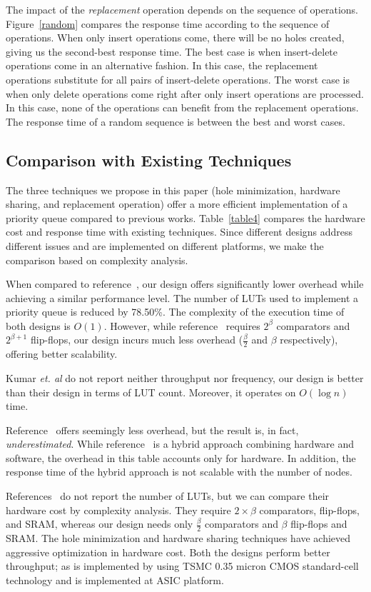 The impact of the {\it replacement} operation depends on the sequence of operations.
Figure~\ref{random} compares the response time according to the sequence of operations.
When only insert operations come, there will be no holes created, giving us the second-best response time.
The best case is when insert-delete operations come in an alternative fashion.
In this case, the replacement operations substitute for all pairs of insert-delete operations.
The worst case is when only delete operations come right after only insert operations are processed.
In this case, none of the operations can benefit from the replacement operations.
The response time of a random sequence is between the best and worst cases.

\subsection{Comparison with Existing Techniques}

The three techniques we propose in this paper (hole minimization, hardware sharing, and replacement operation) offer a more efficient implementation of a priority queue compared to previous works.
Table~\ref{table4} compares the hardware cost and response time with existing techniques.
Since different designs address different issues and are implemented on different platforms, we make the comparison based on complexity analysis.

When compared to reference~\cite{hw8}, our design offers significantly lower overhead while achieving a similar performance level.
The number of LUTs used to implement a priority queue is reduced by 78.50\%.
The complexity of the execution time of both designs is $O(1)$.
However, while reference~\cite{hw8} requires $2^\beta$ comparators and $2^{\beta+1}$ flip-flops, our design incurs much less overhead ($\frac{\beta}{2}$ and $\beta$ respectively), offering better scalability.

Kumar {\it et. al} \cite{hwsw1} do not report neither throughput nor frequency, our design is better than their design in terms of LUT count. Moreover, it operates on $O(\log n)$ time.

Reference~\cite{hw11} offers seemingly less overhead, but the result is, in fact, {\it underestimated}.
While reference~\cite{hw11} is a hybrid approach combining hardware and software, the overhead in this table accounts only for hardware.
In addition, the response time of the hybrid approach is not scalable with the number of nodes.

References~\cite{fpga1,hw2} do not report the number of LUTs, but we can compare their hardware cost by complexity analysis.
They require $2 \times \beta$ comparators, flip-flops, and SRAM, whereas our design needs only $\frac{\beta}{2}$ comparators and $\beta$ flip-flops and SRAM.
The hole minimization and hardware sharing techniques have achieved aggressive optimization in hardware cost. Both the designs perform better throughput; as \cite{hw2} is implemented by using TSMC
0.35  micron CMOS standard-cell technology and \cite{fpga1} is implemented at ASIC platform.
